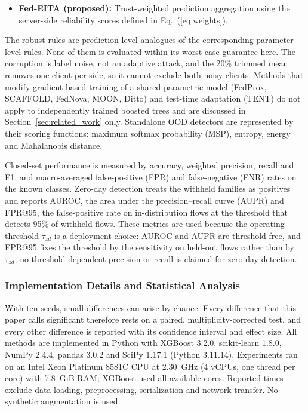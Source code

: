 \documentclass[pdflatex,sn-mathphys-num]{sn-jnl}
\newcommand{\Rtwo}{\color{blue}}
\begin{document}
{{\begin{itemize}
\item \textbf{Fed-EITA (proposed):}
Trust-weighted prediction aggregation using the
server-side reliability scores defined in 
Eq.~(\ref{eq:weights}).
\end{itemize}
The robust rules are prediction-level analogues of the corresponding parameter-level rules. None of them is evaluated within its worst-case guarantee here. The corruption is label noise, not an adaptive attack, and the 20\% trimmed mean removes one client per side, so it cannot exclude both noisy clients. Methods that modify gradient-based training of a shared parametric model (FedProx, SCAFFOLD, FedNova, MOON, Ditto) and test-time adaptation (TENT) do not apply to independently trained boosted trees and are discussed in Section~\ref{sec:related_work} only. Standalone OOD detectors are represented by their scoring functions: maximum softmax probability (MSP), entropy, energy and Mahalanobis distance.

Closed-set performance is measured by accuracy, weighted precision, recall and F1, and macro-averaged false-positive (FPR) and false-negative (FNR) rates on the known classes. Zero-day detection treats the withheld families as positives and reports AUROC, the area under the precision--recall curve (AUPR) and FPR@95, the false-positive rate on in-distribution flows at the threshold that detects 95\% of withheld flows. {\Rtwo These metrics are used because the operating threshold $\tau_{zd}$ is a deployment choice: AUROC and AUPR are threshold-free, and FPR@95 fixes the threshold by the sensitivity on held-out flows rather than by $\tau_{zd}$}; no threshold-dependent precision or recall is claimed for zero-day detection.}
{\color{black}
\subsubsection{Implementation Details and Statistical Analysis}\label{sec:stats_methods}
With ten seeds, small differences can arise by chance. Every difference that this paper calls significant therefore rests on a paired, multiplicity-corrected test, and every other difference is reported with its confidence interval and effect size. All methods are implemented in Python with XGBoost 3.2.0, scikit-learn 1.8.0, NumPy 2.4.4, pandas 3.0.2 and SciPy 1.17.1 (Python 3.11.14). Experiments ran on an Intel Xeon Platinum 8581C CPU at 2.30~GHz (4 vCPUs, one thread per core) with 7.8~GiB RAM; XGBoost used all available cores. Reported times exclude data loading, preprocessing, serialization and network transfer. No synthetic augmentation is used.

}}
\end{document}
